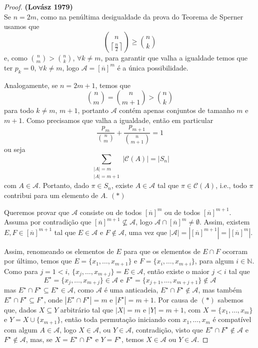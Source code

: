 \documentclass[11pt]{article}
\newcommand{\mc}[1]{\mathcal{#1}}
\newcommand{\mbb}[1]{\mathbb{#1}}
\newcommand{\ol}[1]{\overline{#1}}
\newcommand\ceil[1]{{\left\lceil#1\right\rceil}}
\begin{document}
\begin{proof}\textbf{(Lovász 1979)}\\
    Se $n=2m$, como na penúltima desigualdade da prova do Teorema de Sperner usamos que
    $$\binom{n}{\ceil{\frac{n}{2}}}\geq\binom{n}{k}$$
    e, como $\binom{n}{m}>\binom{n}{k}$, $\forall k\neq m$, para garantir que valha a igualdade temos que ter $p_k=0$, $\forall k\neq m$, logo $\mathscr{A}=[\ol{n}]^m$ é a única possibilidade.

    Analogamente, se $n=2m+1$, temos que
    $$\binom{n}{m}=\binom{n}{m+1}>\binom{n}{k}$$
    para todo $k\neq m$, $m + 1$, portanto $\mathscr{A}$ contém apenas conjuntos de tamanho $m$ e $m + 1$. Como precisamos que valha a igualdade, então em particular
    $$\frac{p_m}{\binom{n}{m}}+\frac{p_{m+1}}{\binom{n}{m+1}}=1$$
    ou seja
    $$\sum_{\substack{|A|=m\\|A|=m+1}}|\mc{C}(A)|=|S_n|$$
    com $A\in\mathscr{A}$. Portanto, dado $\pi\in S_n$, existe $A\in\mathscr{A}$ tal que $\pi\in\mc{C}(A)$, i.e., todo $\pi$ contribui para um elemento de $A$. $(*)$

    Queremos provar que $\mathscr{A}$ consiste ou de todos $[\ol{n}]^m$ ou de todos $[\ol{n}]^{m+1}$. Assuma por contradição que $[\ol{n}]^{m+1}\nsubseteq\mathscr{A}$, logo $\mathscr{A}\cap[\ol{n}]^m\neq\emptyset$. Assim, existem $E,F\in[\ol{n}]^{m+1}$ tal que $E\in\mathscr{A}$ e $F\notin\mathscr{A}$, uma vez que $|\mathscr{A}|=|[\ol{n}]^{m+1}|=|[\ol{n}]^m|$.

    Assim, renomeando os elementos de $E$ para que os elementos de $E\cap F$ ocorram por último, temos que $E=\{x_1,\dots,x_{m+1}\}$ e $F=\{x_i,\dots,x_{m+i}\}$, para algum $i\in\mbb{N}$. Como para $j=1<i$, $\{x_j,\dots,x_{m+j}\}=E\in\mathscr{A}$, então existe o maior $j<i$ tal que
    $$E^\star=\{x_j,\dots,x_{m+j}\}\in\mathscr{A}\text{ e }F^\star=\{x_{j+1},\dots,x_{m+j+1}\}\notin\mathscr{A}$$
    mas $E^\star\cap F^\star\subseteq E^\star\in\mathscr{A}$, como $\mathscr{A}$ é uma anticadeia, $E^\star\cap F^\star\notin\mathscr{A}$, mas também $E^\star\cap F^\star\subseteq F^\star$, onde $|E^\star\cap F^\star|=m$ e $|F^\star|=m+1$. Por causa de $(*)$ sabemos que, dados $X\subseteq Y$ arbitrário tal que $|X|=m$ e $|Y|=m+1$, com $X=\{x_1,\dots,x_m\}$ e $Y=X\cup\{x_{m+1}\}$, então toda permutação iniciando com $x_1,\dots,x_m$ é compatível com algum $A\in\mathscr{A}$, logo $X\in\mathscr{A}$, ou $Y\in\mathscr{A}$, contradição, visto que $E^\star\cap F^\star\notin\mathscr{A}$ e $F^\star\notin\mathscr{A}$, mas, se $X=E^\star\cap F^\star$ e $Y=F^\star$, temos $X\in\mathscr{A}$ ou $Y\in\mathscr{A}$.
\end{proof}
\end{document}
